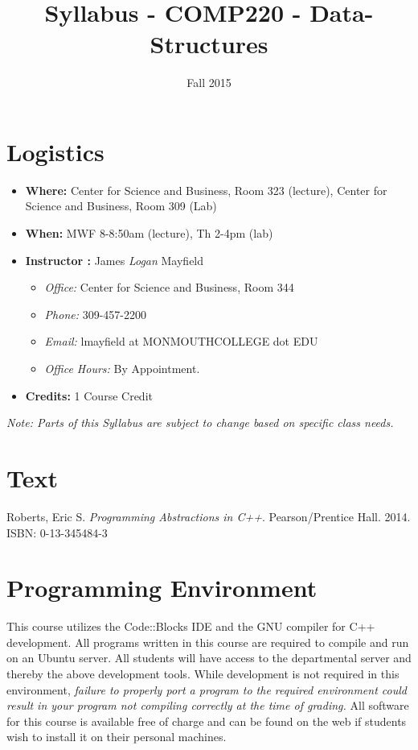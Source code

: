 \documentclass[10pt]{article}
\title{Syllabus - COMP220 - Data-Structures}
\author{ }
\date{Fall 2015}
\begin{document}
\maketitle

\section{Logistics}
\begin{itemize}
\item \textbf{Where: } Center for Science and Business, Room 323 (lecture), Center for Science and Business, Room 309 (Lab)
\item \textbf{When: } MWF 8-8:50am (lecture), Th 2-4pm (lab)
\item \textbf{Instructor :} James \textit{Logan} Mayfield
\begin{itemize}
\item \textit{Office: } Center for Science and Business, Room 344
\item \textit{Phone: } 309-457-2200
\item \textit{Email: } lmayfield at MONMOUTHCOLLEGE dot EDU
\item \textit{Office Hours: }   By Appointment. 
\end{itemize}

\item \textbf{Credits: } 1 Course Credit
\end{itemize}
\emph{Note: Parts of this Syllabus are subject to change based on specific class needs.}

\section{Text}

Roberts, Eric S.  \textit{Programming Abstractions in C++}. Pearson/Prentice Hall. 2014. ISBN: 0-13-345484-3


\section{Programming Environment}
This course utilizes the Code::Blocks IDE and the GNU compiler for C++ development.  All programs written in this course are required to compile and run on an Ubuntu server.  All students will have access to the departmental server and thereby the above development tools.  While development is not required in this environment, \emph{failure to properly port a program to the required environment could result in your program not compiling correctly at the time of grading.}  All software for this course is available free of charge and can be found on the web if students wish to install it on their personal machines.  
\end{document}
